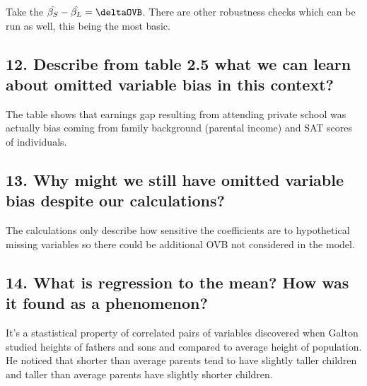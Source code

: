 \documentclass[
]{article}
\begin{document}
Take the \(\hat{\beta_S} - \hat{\beta_L} = \deltaOVB\). There are other
robustness checks which can be run as well, this being the most basic.

\subsection{12. Describe from table 2.5 what we can learn about omitted
variable bias in this
context?}\label{describe-from-table-2.5-what-we-can-learn-about-omitted-variable-bias-in-this-context}

The table shows that earnings gap resulting from attending private
school was actually bias coming from family background (parental income)
and SAT scores of individuals.

\subsection{13. Why might we still have omitted variable bias despite
our
calculations?}\label{why-might-we-still-have-omitted-variable-bias-despite-our-calculations}

The calculations only describe how sensitive the coefficients are to
hypothetical missing variables so there could be additional OVB not
considered in the model.

\subsection{14. What is regression to the mean? How was it found as a
phenomenon?}\label{what-is-regression-to-the-mean-how-was-it-found-as-a-phenomenon}

It's a stastistical property of correlated pairs of variables discovered
when Galton studied heights of fathers and sons and compared to average
height of population. He noticed that shorter than average parents tend
to have slightly taller children and taller than average parents have
slightly shorter children.
\end{document}
